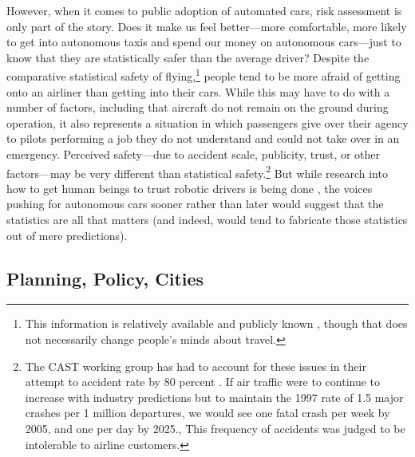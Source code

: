 However, when it comes to public adoption of automated cars,
risk assessment is only part of the story. Does it make us feel better---more
comfortable, more likely to get into autonomous taxis and spend our
money on autonomous cars---just to know that they are statistically safer
than the average driver? Despite the comparative
statistical safety of flying,\footnote{This information is relatively
  available and publicly known \cite{airlinereporter}, though that does not
  necessarily change people's minds about travel.}
people tend to be more afraid of getting onto an airliner than getting into their
cars. While this may have to do with a number of factors,
including that aircraft do not remain on the ground during operation,
it also represents a situation in which passengers give over their
agency to pilots performing a job they do not understand and could not
take over in an emergency. Perceived safety---due to accident scale,
publicity, trust, or other factors---may be very different than statistical
safety.\footnote{The CAST working group has had to account for these
  issues in their attempt to accident rate by 80 percent \cite[p.
    28]{PARCCAST}.
If air traffic were to continue to increase
with industry predictions but to maintain the 1997 rate of 1.5 major
crashes per 1 million departures, we would see one fatal crash per
week by 2005, and one per day by 2025.\cite{predictmorecrashes},
This frequency of accidents was judged to be intolerable to
airline customers.} But while research into how to get human beings to trust robotic drivers
is being done \cite{rossTrust}, the voices pushing for autonomous cars sooner
rather than later would suggest that the statistics are all that
matters (and indeed, would tend to fabricate those statistics out of
mere predictions). 


\subsection{Planning, Policy, Cities}



